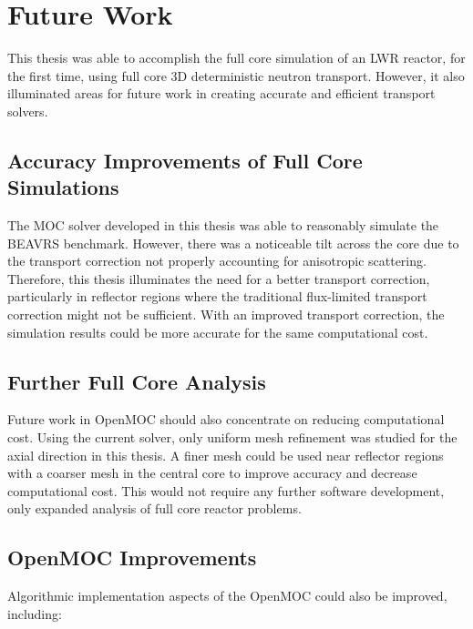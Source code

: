 \section{Future Work}
\label{sec:future-work}

This thesis was able to accomplish the full core simulation of an \ac{LWR} reactor, for the first time, using full core 3D deterministic neutron transport. However, it also illuminated areas for future work in creating accurate and efficient transport solvers.

\subsection{Accuracy Improvements of Full Core Simulations}

The \ac{MOC} solver developed in this thesis was able to reasonably simulate the BEAVRS benchmark. However, there was a noticeable tilt across the core due to the transport correction not properly accounting for anisotropic scattering. Therefore, this thesis illuminates the need for a better transport correction, particularly in reflector regions where the traditional flux-limited transport correction might not be sufficient. With an improved transport correction, the simulation results could be more accurate for the same computational cost.

\subsection{Further Full Core Analysis}

Future work in OpenMOC should also concentrate on reducing computational cost. Using the current solver, only uniform mesh refinement was studied for the axial direction in this thesis. A finer mesh could be used near reflector regions with a coarser mesh in the central core to improve accuracy and decrease computational cost. This would not require any further software development, only expanded analysis of full core reactor problems.

\subsection{OpenMOC Improvements}

Algorithmic implementation aspects of the OpenMOC could also be improved, including:

